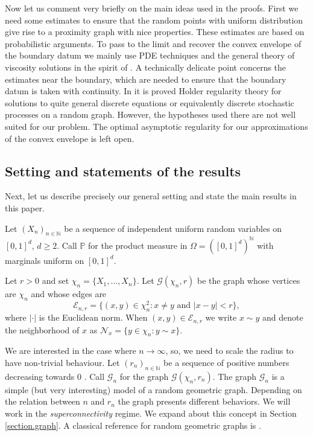 \documentclass[11pt]{amsart}
\theoremstyle{definition}
\theoremstyle{remark}
\numberwithin{equation}{section}
\newcommand{\N}{{\mathbb N}}
\renewcommand{\P}{\mathbb{P}}
\newcommand{\G}{\mathcal{G}}
\newcommand{\Ec}{\mathcal{E}}
\newcommand{\Nc}{{\mathcal N}}
\begin{document}
	Now let us comment very briefly on the main ideas used in the proofs. 
First we need some estimates to ensure that the random points with uniform distribution give rise to a proximity graph with nice properties. 
These estimates are based on probabilistic arguments. 
To pass to the limit and recover the convex envelope of the boundary datum we mainly use PDE techniques and the general theory of viscosity solutions \cite{CIL,Koike} in the spirit of \cite{BarSou}.
	A technically delicate point concerns the estimates near the boundary, which are needed to ensure that the boundary datum is taken with continuity. 
	In \cite{Arroyo} it is proved Holder regularity theory for solutions to quite general discrete equations or equivalently discrete stochastic processes on a random graph. However, the hypotheses used there are not well suited for our problem. The optimal asymptotic regularity for our approximations of the convex envelope is left open.

\subsection{Setting and statements of the results} 
\label{subsect-descrip.environment}
Next, let us describe precisely our general setting and state the main results in this paper.

Let $(X_n)_{n\in\N}$ be a sequence of independent uniform random variables on $[0,1]^d$, $d\geq 2$.
Call $\P$ for the product measure in $\Omega = ([0, 1]^d)^\N$ with marginals uniform on $[0, 1]^d$. 

Let $r>0$ and set $\chi_n=\{X_1,\ldots,X_{n}\}$.
Let $\G(\chi_n,r)$ be the graph whose vertices are $\chi_n$ and whose edges are  
\[
\Ec_{n,r} 
=
\Big\{ (x,y)\in \chi_n ^2 \colon x\neq y \text{ and } |x-y|<r \Big\},
\]
where $|\cdot |$ is the Euclidean norm.
When $(x, y)\in \Ec_{n,r}$ we write $x\sim y$ and denote the neighborhood of $x$ as $\Nc_x =\{y\in \chi_n \colon y\sim x\}$. 

We are interested in the case where $n\to \infty$, so, we need to scale the radius to have non-trivial behaviour.
Let $(r_n)_{n\in\N}$ be a sequence of positive numbers decreasing towards $0$ .
Call $\G_n$ for the graph $\G(\chi_n,r_n)$.
The graph $\G_n$ is a simple (but very interesting) model of a random geometric graph.
Depending on the relation between $n$ and $r_n$ the graph presents different behaviors. 
We will work in the \emph{superconnectivity} regime.
We expand about this concept in Section \ref{section.graph}.
A classical reference for random geometric graphs is \cite{penrose}.
\end{document}
